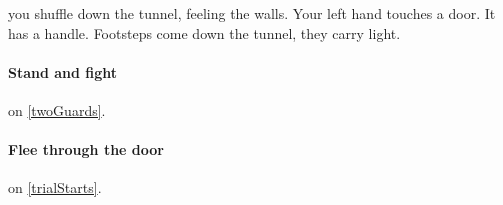 you shuffle down the tunnel, feeling the walls.
Your left hand touches a door.
It has a handle.
Footsteps come down the tunnel, they carry light.

\paragraph{Stand and fight}
on \vref{twoGuards}.

\paragraph{Flee through the door}
on \vref{trialStarts}.
